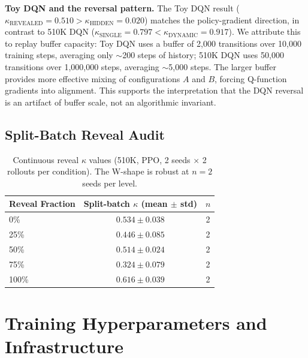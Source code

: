 \documentclass[letterpaper]{article}
\begin{document}
\medskip
\noindent\textbf{Toy DQN and the reversal pattern.}
The Toy DQN result ($\kappa_{\text{REVEALED}} = 0.510 > \kappa_{\text{HIDDEN}} = 0.020$) matches the policy-gradient direction, in contrast to 510K DQN ($\kappa_{\text{SINGLE}} = 0.797 < \kappa_{\text{DYNAMIC}} = 0.917$).
We attribute this to replay buffer capacity: Toy DQN uses a buffer of 2,000 transitions over 10,000 training steps, averaging only $\sim$200 steps of history; 510K DQN uses 50,000 transitions over 1,000,000 steps, averaging $\sim$5,000 steps.
The larger buffer provides more effective mixing of configurations $A$ and $B$, forcing Q-function gradients into alignment.
This supports the interpretation that the DQN reversal is an artifact of buffer scale, not an algorithmic invariant.

\subsection{Split-Batch Reveal Audit}

\begin{table}[h]
\centering
\small
\begin{tabular}{lcc}
\toprule
Reveal Fraction & Split-batch $\kappa$ (mean $\pm$ std) & $n$ \\
\midrule
0\%   & $0.534 \pm 0.038$ & 2 \\
25\%  & $0.446 \pm 0.085$ & 2 \\
50\%  & $0.514 \pm 0.024$ & 2 \\
75\%  & $0.324 \pm 0.079$ & 2 \\
100\% & $0.616 \pm 0.039$ & 2 \\
\bottomrule
\end{tabular}
\caption{Continuous reveal $\kappa$ values (510K, PPO, 2 seeds $\times$ 2 rollouts per condition). The W-shape is robust at $n=2$ seeds per level.}
\end{table}

\section{Training Hyperparameters and Infrastructure}
\end{document}

